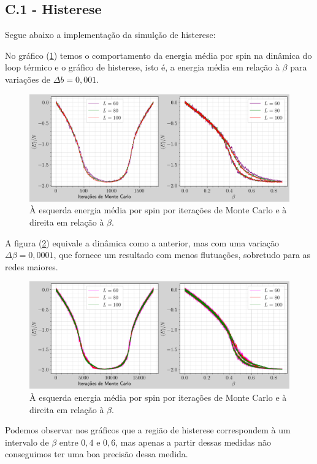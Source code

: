 \subsection{C.1 - Histerese }
Segue abaixo a implementação da simulção de histerese:


No gráfico (\ref{fig:c1_dbeta1}) temos o comportamento da energia média por spin na dinâmica do loop
térmico e o gráfico de histerese, isto é, a energia média em relação à $\beta$ para 
variações de $\Delta b = 0,001$. 

\begin{figure}
    \centering
    \includegraphics[width=0.8\linewidth]{graficos/tarefa-3/graf-tarefa-C1-delta1.png}
    \caption{À esquerda energia média por spin por iterações de Monte Carlo e à direita em relação à $\beta$.}
    \label{fig:c1_dbeta1}
\end{figure}


A figura (\ref{fig:c1_dbeta2}) equivale a dinâmica como a anterior, mas com uma variação 
$\Delta \beta = 0,0001$, que fornece um resultado com menos flutuações, sobretudo para as redes maiores.

\begin{figure}
    \centering
    \includegraphics[width=0.8\linewidth]{graficos/tarefa-3/graf-tarefa-C1-delta2.png}
    \caption{À esquerda energia média por spin por iterações de Monte Carlo e à direita em relação à $\beta$.}
    \label{fig:c1_dbeta2}
\end{figure}

Podemos observar nos gráficos que a região de histerese correspondem à um intervalo de $\beta$ entre $0,4$ e 
$0,6$, mas apenas a partir dessas medidas não conseguimos ter uma boa precisão dessa medida.

